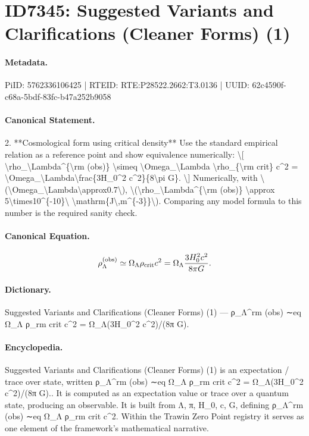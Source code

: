 \section*{ID7345: Suggested Variants and Clarifications (Cleaner Forms) (1)}
\paragraph{Metadata.}
PiID: 5762336106425 | RTEID: RTE:P28522.2662:T3.0136 | UUID: 62c4590f-c68a-5bdf-83fc-b47a252b9058

\paragraph{Canonical Statement.}
2. **Cosmological form using critical density** Use the standard empirical relation as a reference point and show equivalence numerically: \textbackslash{}[ \textbackslash{}rho\_\textbackslash{}Lambda\textasciicircum{}\{\textbackslash{}rm (obs)\} \textbackslash{}simeq \textbackslash{}Omega\_\textbackslash{}Lambda \textbackslash{}rho\_\{\textbackslash{}rm crit\} c\textasciicircum{}2 = \textbackslash{}Omega\_\textbackslash{}Lambda\textbackslash{}frac\{3H\_0\textasciicircum{}2 c\textasciicircum{}2\}\{8\textbackslash{}pi G\}. \textbackslash{}] Numerically, with \textbackslash{}(\textbackslash{}Omega\_\textbackslash{}Lambda\textbackslash{}approx0.7\textbackslash{}), \textbackslash{}(\textbackslash{}rho\_\textbackslash{}Lambda\textasciicircum{}\{\textbackslash{}rm (obs)\} \textbackslash{}approx 5\textbackslash{}times10\textasciicircum{}\{-10\}\textbackslash{} \textbackslash{}mathrm\{J\textbackslash{},m\textasciicircum{}\{-3\}\}\textbackslash{}). Comparing any model formula to this number is the required sanity check.

\paragraph{Canonical Equation.}
\[
\rho_\Lambda^{\rm (obs)} \simeq \Omega_\Lambda \rho_{\rm crit} c^2 = \Omega_\Lambda\frac{3H_0^2 c^2}{8\pi G}.
\]

\paragraph{Dictionary.}
Suggested Variants and Clarifications (Cleaner Forms) (1) — ρ\_Λ\textasciicircum{}rm (obs) ∼eq Ω\_Λ ρ\_rm crit c\textasciicircum{}2 = Ω\_Λ(3H\_0\textasciicircum{}2 c\textasciicircum{}2)/(8π G).

\paragraph{Encyclopedia.}
Suggested Variants and Clarifications (Cleaner Forms) (1) is an expectation / trace over state, written ρ\_Λ\textasciicircum{}rm (obs) ∼eq Ω\_Λ ρ\_rm crit c\textasciicircum{}2 = Ω\_Λ(3H\_0\textasciicircum{}2 c\textasciicircum{}2)/(8π G).. It is computed as an expectation value or trace over a quantum state, producing an observable. It is built from Λ, π, H\_0, c, G, defining ρ\_Λ\textasciicircum{}rm (obs) ∼eq Ω\_Λ ρ\_rm crit c\textasciicircum{}2. Within the Trawin Zero Point registry it serves as one element of the framework's mathematical narrative.
